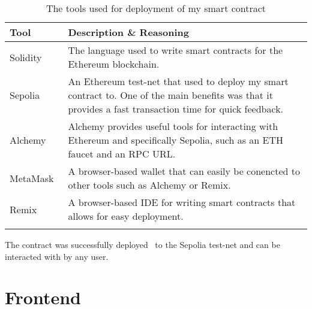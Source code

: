 \begin{longtable}{p{} p{}}
  \toprule
  \textbf{Tool} & \textbf{Description \& Reasoning}
  \\\midrule\midrule
  Solidity~\cite{noauthor_solidity_nodate}
  & The language used to write smart contracts for the Ethereum blockchain.\\
  Sepolia~\cite{noauthor_sepolia_nodate}
  & An Ethereum test-net that used to deploy my smart contract to. One of the main benefits was that it provides a fast transaction time for quick feedback.\\
  Alchemy~\cite{noauthor_alchemy_nodate}
  & Alchemy provides useful tools for interacting with Ethereum and specifically Sepolia, such as an ETH faucet and an RPC URL.\\
  MetaMask~\cite{noauthor_crypto_nodate}
  & A browser-based wallet that can easily be conencted to other tools such as Alchemy or Remix.\\
  Remix~\cite{noauthor_remix_nodate}
  & A browser-based IDE for writing smart contracts that allows for easy deployment.
  \\\bottomrule\bottomrule
  \caption{The tools used for deployment of my smart contract}
\end{longtable}

\vspace{2mm}\noindent
The contract was successfully deployed~\cite{etherscanio_deployed_nodate} to the Sepolia test-net and can be interacted with by any user.

\section{Frontend}

